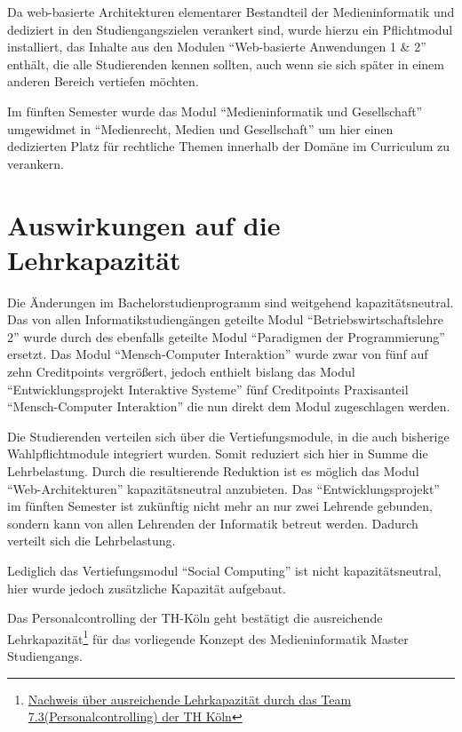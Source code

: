 Da web-basierte Architekturen elementarer Bestandteil der
Medieninformatik und dediziert in den Studiengangszielen verankert sind,
wurde hierzu ein Pflichtmodul installiert, das Inhalte aus den Modulen
``Web-basierte Anwendungen 1 \& 2'' enthält, die alle Studierenden
kennen sollten, auch wenn sie sich später in einem anderen Bereich
vertiefen möchten.

Im fünften Semester wurde das Modul ``Medieninformatik und
Gesellschaft'' umgewidmet in ``Medienrecht, Medien und Gesellschaft'' um
hier einen dedizierten Platz für rechtliche Themen innerhalb der Domäne
im Curriculum zu verankern.

\section{Auswirkungen auf die
Lehrkapazität}\label{auswirkungen-auf-die-lehrkapazituxe4t}

Die Änderungen im Bachelorstudienprogramm sind weitgehend
kapazitätsneutral. Das von allen Informatikstudiengängen geteilte Modul
``Betriebswirtschaftslehre 2'' wurde durch des ebenfalls geteilte Modul
``Paradigmen der Programmierung'' ersetzt. Das Modul ``Mensch-Computer
Interaktion'' wurde zwar von fünf auf zehn Creditpoints vergrößert,
jedoch enthielt bislang das Modul ``Entwicklungsprojekt Interaktive
Systeme'' fünf Creditpoints Praxisanteil ``Mensch-Computer Interaktion''
die nun direkt dem Modul zugeschlagen werden.

Die Studierenden verteilen sich über die Vertiefungsmodule, in die auch
bisherige Wahlpflichtmodule integriert wurden. Somit reduziert sich hier
in Summe die Lehrbelastung. Durch die resultierende Reduktion ist es
möglich das Modul ``Web-Architekturen'' kapazitätsneutral anzubieten.
Das ``Entwicklungsprojekt'' im fünften Semester ist zukünftig nicht mehr
an nur zwei Lehrende gebunden, sondern kann von allen Lehrenden der
Informatik betreut werden. Dadurch verteilt sich die Lehrbelastung.

Lediglich das Vertiefungsmodul ``Social Computing'' ist nicht
kapazitätsneutral, hier wurde jedoch zusätzliche Kapazität aufgebaut.

Das Personalcontrolling der TH-Köln geht bestätigt die ausreichende
Lehrkapazität\footnote{\href{https://th-koeln.github.io/mi-2017/anhaenge/th-verwaltung-kapa-nachweis.pdf}{Nachweis
  über ausreichende Lehrkapazität durch das Team
  7.3(Personalcontrolling) der TH Köln}} für das vorliegende Konzept des
Medieninformatik Master Studiengangs.


